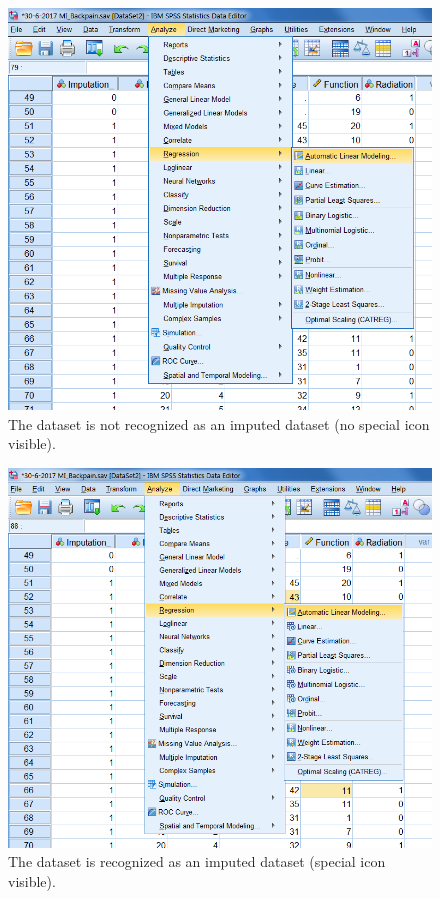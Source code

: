 \documentclass[]{book}
\theoremstyle{definition}
\theoremstyle{definition}
\theoremstyle{definition}
\theoremstyle{remark}
\begin{document}
\begin{figure}

{\centering \includegraphics[width=0.9\linewidth]{images/fig5.4a} 

}

\caption{The dataset is not recognized as an imputed dataset (no special icon visible).}\label{fig:fig5-4a}
\end{figure}

\begin{figure}

{\centering \includegraphics[width=0.9\linewidth]{images/fig5.4b} 

}

\caption{The dataset is recognized as an imputed dataset (special icon visible).}\label{fig:fig5-4b}
\end{figure}
\end{document}
